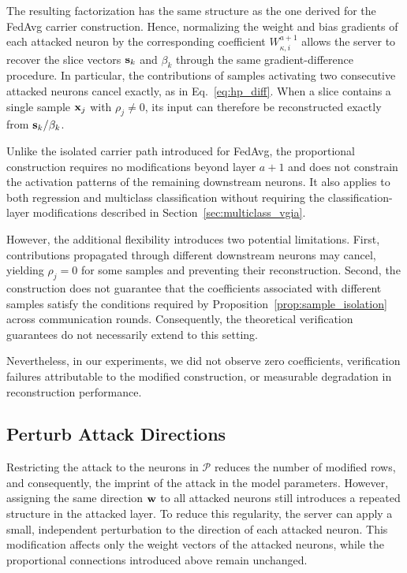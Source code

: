 The resulting factorization has the same structure as the one derived for the FedAvg carrier construction. Hence, normalizing the weight and bias gradients of each attacked neuron by the corresponding coefficient $W^{a+1}_{\kappa,i}$ allows the server to recover the slice vectors $\mathbf{s}_k$ and $\beta_k$ through the same gradient-difference procedure. In particular, the contributions of samples activating two consecutive attacked neurons cancel exactly, as in Eq.~\eqref{eq:hp_diff}. When a slice contains a single sample ${\mathbf{x}}_j$ with $\rho_j\neq 0$, its input can therefore be reconstructed exactly from $\mathbf{s}_k/\beta_k$.

Unlike the isolated carrier path introduced for FedAvg, the proportional construction requires no modifications beyond layer $a+1$ and does not constrain the activation patterns of the remaining downstream neurons. It also applies to both regression and multiclass classification without requiring the classification-layer modifications described in Section~\ref{sec:multiclass_vgia}.

However, the additional flexibility introduces two potential limitations. First, contributions propagated through different downstream neurons may cancel, yielding $\rho_j=0$ for some samples and preventing their reconstruction. Second, the construction does not guarantee that the coefficients associated with different samples satisfy the conditions required by Proposition~\ref{prop:sample_isolation} across communication rounds. Consequently, the theoretical verification guarantees do not necessarily extend to this setting.

Nevertheless, in our experiments, we did not observe zero coefficients, verification failures attributable to the modified construction, or measurable degradation in reconstruction performance.

\subsection{Perturb Attack Directions}

Restricting the attack to the neurons in $\mathcal P$ reduces the number of
modified rows, and consequently, the imprint of the attack in the model parameters. However, assigning the same direction $\mathbf{w}$ to all attacked
neurons still introduces a repeated structure in the attacked layer. To reduce
this regularity, the server can apply a small, independent perturbation to the
direction of each attacked neuron. This modification affects only the weight
vectors of the attacked neurons, while the proportional connections introduced
above remain unchanged.

